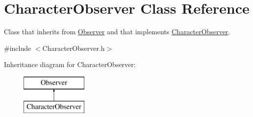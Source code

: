 \hypertarget{class_character_observer}{}\section{Character\+Observer Class Reference}
\label{class_character_observer}


Class that inherits from \hyperlink{class_observer}{Observer} and that implements \hyperlink{class_character_observer}{Character\+Observer}.  




{\ttfamily \#include $<$Character\+Observer.\+h$>$}

Inheritance diagram for Character\+Observer\+:\begin{figure}[H]
\begin{center}
\leavevmode
\includegraphics[height=2.000000cm]{class_character_observer}
\end{center}
\end{figure}

